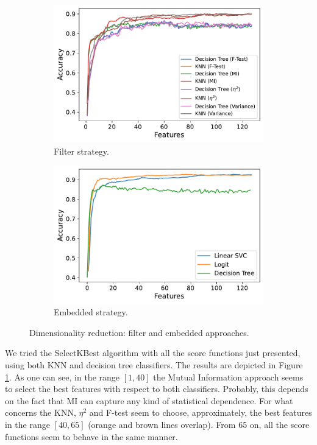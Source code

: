 \documentclass[10pt, a4paper, twocolumn]{article}
\begin{document}
\begin{figure}
    \centering
    \begin{subfigure}[t]{0.49\linewidth}
        \includegraphics[width=\linewidth]{immagini simone/output_214_0.pdf}
        \caption{Filter strategy.}
        \label{fig:filter}
    \end{subfigure}
    \hfill%
    \begin{subfigure}[t]{0.49\columnwidth}
        \includegraphics[width=\linewidth]{immagini simone/output_118_0.pdf}
        \caption{Embedded strategy.}
        \label{fig:embedded}
    \end{subfigure}
    \caption{Dimensionality reduction: filter and embedded approaches.}
\end{figure}

We tried the SelectKBest algorithm with all the score functions just presented, using both KNN and decision tree classifiers. The results are depicted in Figure \ref{fig:filter}. As one can see, in the range $[1,40]$ the Mutual Information approach seems to select the best features with respect to both classifiers. Probably, this depends on the fact that MI can capture any kind of statistical dependence. For what concerns the KNN, $\eta^2$ and F-test seem to choose, approximately, the best features in the range $[40, 65]$ (orange and brown lines overlap). From 65 on, all the score functions seem to behave in the same manner.
\end{document}
